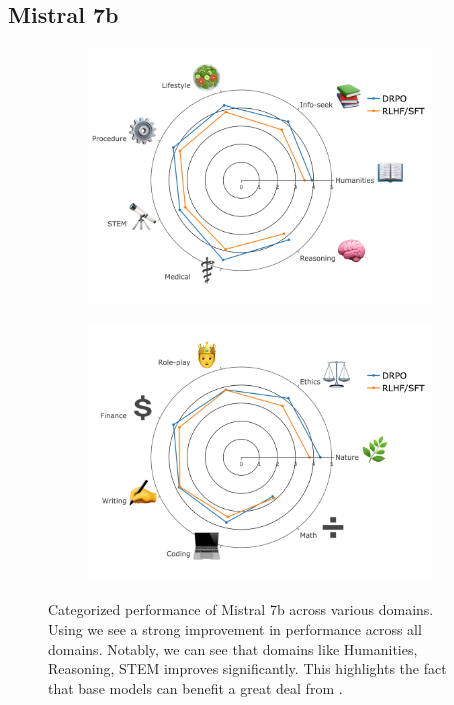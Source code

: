 \subsection{Mistral 7b}
\begin{figure}[h]
\centering
\begin{subfigure}[b]{.5\textwidth}
  \centering
  \includegraphics[width=0.95\linewidth]{images/mistral_1.png}
  \label{fig:cat_mistral_1}
\end{subfigure}%

\vspace{1em}

\begin{subfigure}[b]{.5\textwidth}
  \centering
  \includegraphics[width=0.95\linewidth]{images/mistral_2.png}
  \label{fig:cat_mistral_2}
\end{subfigure}
\caption{Categorized performance of Mistral 7b across various domains. Using \ours we see a strong improvement in performance across all domains. Notably, we can see that domains like Humanities, Reasoning, STEM improves significantly. This highlights the fact that base models can benefit a great deal from \ours.  }
\label{fig:categorized_performance_mistral}
\end{figure}

